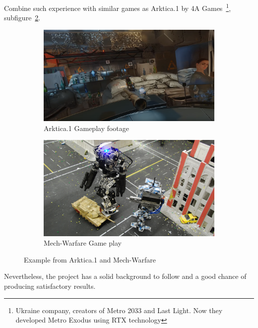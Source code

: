 Combine such experience with similar games as Arktica.1 by 4A Games~\footnote{Ukraine company, creators of Metro 2033 and Last Light. Now they developed Metro Exodus using RTX technology}, subfigure~\ref{fig:mech}.
\begin{figure}[H]
	\centering
	\begin{subfigure}[b]{0.4\textwidth}
		\includegraphics[width=\linewidth]{background/fig/Arkticak1.png}
		\caption{Arktica.1 Gameplay footage}
		\label{fig:OculusArc}
	\end{subfigure}
	\begin{subfigure}[b]{0.4\textwidth}
		\includegraphics[width=\linewidth]{background/fig/mech.jpg}
		\caption{Mech-Warfare Game play}
		\label{fig:mech}
	\end{subfigure}        
	\caption{Example from Arktica.1 and Mech-Warfare}\label{fig:play-exampl}
\end{figure}
Nevertheless, the project has a solid background to follow and a good chance of producing satisfactory results.
